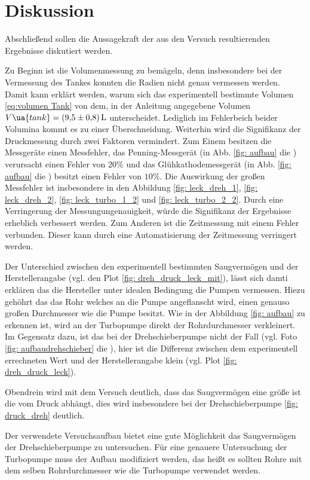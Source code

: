 \section{Diskussion}

Abschließend sollen die Aussagekraft der aus den Versuch resultierenden Ergebnisse diskutiert werden.

Zu Beginn ist die Volumenmessung zu bemägeln, denn insbesondere bei der Vermessung des Tankes
konnten die Radien nicht genau vermessen werden. Damit kann erklärt werden, warum sich das experimentell
bestimmte Volumen \eqref{eq:volumen Tank} von dem, in der Anleitung \cite{} angegebene Volumen
$V\ua{tank}=\SI{9.5\pm0,8}{\litre}$ unterscheidet. Lediglich im Fehlerbeich beider Volumina
kommt es zu einer Überschneidung.
Weiterhin wird die Signifikanz der Druckmessung durch zwei Faktoren vermindert.
Zum Einem besitzen die Messgeräte einen Messfehler, das Penning-Messgerät (in Abb. \ref{fig: aufbau} die ) verursacht einen Fehler von $20\%$ und das
Glühkathodemessgerät (in Abb. \ref{fig: aufbau} die ) besitzt einen Fehler von $10\%$. Die Auswirkung der großen Messfehler
ist insbesondere in den Abbildung \ref{fig: leck_dreh_1}, \ref{fig: leck_dreh_2}, \ref{fig: leck_turbo_1_2} und \ref{fig: leck_turbo_2_2}.
Durch eine Verringerung der Messungungenauigkeit, würde die Signifikanz der Ergebnisse erheblich verbessert werden.
Zum Anderen ist die Zeitmessung mit einem Fehler verbunden. Dieser kann durch eine Automatisierung der Zeitmessung verringert werden.

Der Unterschied zwischen den experimentell bestimmten Saugvermögen und der Herstellerangabe (vgl. den Plot \ref{fig: dreh_druck_leck_mit}),
lässt sich damti erklären das die Hersteller unter idealen Bedingung die Pumpen vermessen. Hiezu gehöhrt das das Rohr welches an die Pumpe angeflanscht wird,
einen genauso großen Durchmesser wie die Pumpe besitzt. Wie in der Abbildung \ref{fig: aufbau} zu erkennen ist, wird an der Turbopumpe  direkt der
Rohrdurchmesser verkleinert. Im Gegensatz dazu, ist das bei der Drehschieberpumpe nicht der Fall (vgl. Foto \ref{fig: aufbaudrehschieber} die ),
hier ist die Differenz zwischen dem experimentell errechneten Wert und der Herstellerangabe klein (vgl. Plot \ref{fig: dreh_druck_leck}).

Obendrein wird mit dem Versuch deutlich, dass das Saugvermögen eine größe ist die vom Druck abhängt, dies wird insbesondere
bei der Drehschieberpumpe \ref{fig: druck_dreh} deutlich. 

Der verwendete Versuchsaufbau bietet eine gute Möglichkeit das Saugvermögen der Drehschieberpumpe zu untersuchen.
Für eine genauere Untersuchung der Turbopumpe muss der Aufbau modifiziert werden, das heißt es sollten Rohre mit
 dem selben Rohrdurchmesser wie die Turbopumpe verwendet werden.
